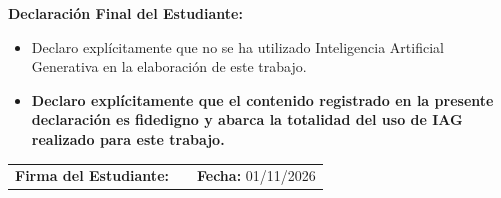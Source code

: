 \documentclass{report}
\begin{document}
\vspace{1.5em}
\noindent\textbf{Declaración Final del Estudiante:}
\begin{itemize}
    \item[$\square$] Declaro explícitamente que no se ha utilizado Inteligencia Artificial Generativa en la elaboración de este trabajo.
    \item[$\boxtimes$] \textbf{Declaro explícitamente que el contenido registrado en la presente declaración es fidedigno y abarca la totalidad del uso de IAG realizado para este trabajo.}
\end{itemize}

\vspace{2.5em}
\noindent\begin{tabular}{l p{7cm} l}
\textbf{Firma del Estudiante:} & & \textbf{Fecha:} 01/11/2026 \\
\end{tabular}

\newpage
\printbibliography[heading=bibintoc, title={Referencias Bibliográficas}]
\end{document}

